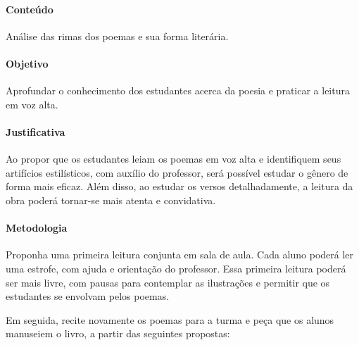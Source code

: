 \documentclass[11pt]{extarticle}
\begin{document}
\paragraph{Conteúdo} Análise das rimas dos poemas e sua forma literária.


\paragraph{Objetivo} Aprofundar o conhecimento dos estudantes acerca da poesia e praticar a leitura em voz alta.

\paragraph{Justificativa} Ao propor que os estudantes leiam os poemas em voz alta e identifiquem seus artifícios estilísticos, com auxílio do professor, será possível estudar o gênero de forma mais eficaz. Além disso, ao estudar os versos detalhadamente, a leitura da obra poderá tornar-se mais atenta e convidativa.


\paragraph{Metodologia} Proponha uma primeira leitura conjunta em sala de aula. Cada aluno poderá ler uma estrofe, com ajuda e orientação do professor. Essa primeira leitura poderá ser mais livre, com pausas para contemplar as ilustrações e permitir que os estudantes se envolvam pelos poemas. 


Em seguida, recite novamente os poemas para a turma e peça que os alunos manuseiem o livro, a partir das seguintes propostas:
\end{document}
